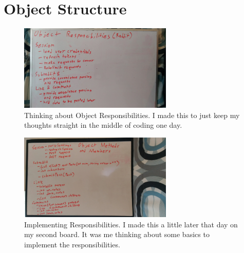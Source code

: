 \documentclass[12pt]{article}
\begin{document}
\section{Object Structure}
\begin{figure}[ht]
	\centering
	\caption{Thinking about Object Responsibilities. I made this to just keep my thoughts straight in the middle of coding one day.}
	\label{object_structure2}
	\includegraphics[width=0.65\textwidth]{object_structure2.jpg}
	\vspace{-10pt}
\end{figure}
\begin{figure}[ht]
	\centering
	\caption{Implementing Responsibilities. I made this a little later that day on my second board. It was me thinking about some basics to implement the responsibilities.}
	\label{object_structure1}
	\includegraphics[width=0.65\textwidth]{object_structure1.jpg}
	\vspace{-10pt}
\end{figure}

\clearpage
\end{document}
